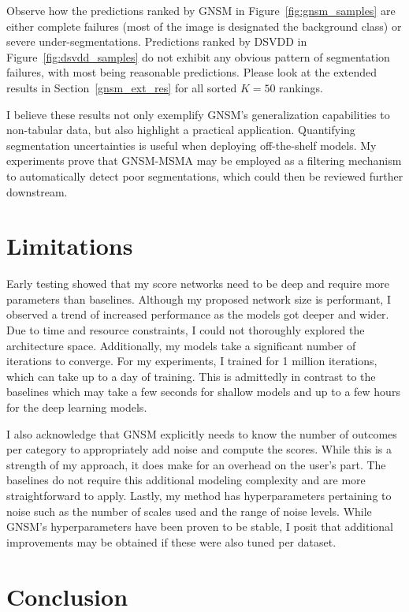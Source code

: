 Observe how the predictions ranked by GNSM in Figure~\ref{fig:gnsm_samples} are either complete failures (most of the image is designated the background class) or severe under-segmentations. Predictions ranked by DSVDD in Figure~\ref{fig:dsvdd_samples} do not exhibit any obvious pattern of segmentation failures, with most being reasonable predictions. Please look at the extended results in Section~\ref{gnsm_ext_res} for all sorted $K=50$ rankings. 


I believe these results not only exemplify GNSM’s generalization capabilities to non-tabular data, but also highlight a practical application. Quantifying segmentation uncertainties is useful when deploying off-the-shelf models. My experiments prove that GNSM-MSMA may be employed as a filtering mechanism to automatically detect poor segmentations, which could then be reviewed further downstream.

\section{Limitations}

Early testing showed that my score networks need to be deep and require more parameters than baselines. Although my proposed network size is performant, I observed a trend of increased performance as the models got deeper and wider. Due to time and resource constraints, I could not thoroughly explored the architecture space. Additionally, my models take a significant number of iterations to converge. For my experiments, I trained for 1 million iterations, which can take up to a day of training. This is admittedly in contrast to the baselines which may take a few seconds for shallow models and up to a few hours for the deep learning models.

I also acknowledge that GNSM explicitly needs to know the number of outcomes per category to appropriately add noise and compute the scores. While this is a strength of my approach, it does make for an overhead on the user's part. The baselines do not require this additional modeling complexity and are more straightforward to apply. Lastly, my method has hyperparameters pertaining to noise such as the number of scales used and the range of noise levels. While GNSM's hyperparameters have been proven to be stable, I posit that additional improvements may be obtained if these were also tuned per dataset.


\section{Conclusion}


